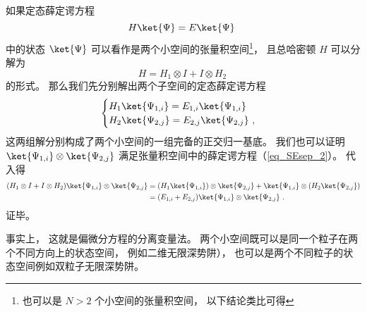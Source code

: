 
\begin{issues}
\issueDraft
\end{issues}


如果定态薛定谔方程
\begin{equation}\label{eq_SEsep_2}
H \ket{\Psi} = E \ket{\Psi}~
\end{equation}
中的状态 $\ket{\Psi}$ 可以看作是两个小空间的张量积空间\footnote{也可以是 $N > 2$ 个小空间的张量积空间， 以下结论类比可得}， 且总哈密顿 $H$ 可以分解为
\begin{equation}\label{eq_SEsep_1}
H = H_1 \otimes I + I \otimes H_2~
\end{equation}
的形式。 那么我们先分别解出两个子空间的定态薛定谔方程
\begin{equation}
\begin{cases}
H_1 \ket{\Psi_{1,i}} = E_{1,i} \ket{\Psi_{1,i}}\\
H_2 \ket{\Psi_{2,j}} = E_{2,j} \ket{\Psi_{2,j}}~,
\end{cases}
\end{equation}
这两组解分别构成了两个小空间的一组完备的正交归一基底。 我们也可以证明 $\ket{\Psi_{1,i}} \otimes \ket{\Psi_{2,j}}$ 满足张量积空间中的薛定谔方程（\autoref{eq_SEsep_2}）。 代入得
\begin{equation}
\begin{aligned}
(H_1 \otimes I + I \otimes H_2) \ket{\Psi_{1,i}} \otimes \ket{\Psi_{2,j}} &= (H_1 \ket{\Psi_{1,i}}) \otimes \ket{\Psi_{2,j}} +  \ket{\Psi_{1,i}} \otimes (H_2 \ket{\Psi_{2,j}})\\
&= (E_{1,i} + E_{2, j}) \ket{\Psi_{1,i}} \otimes \ket{\Psi_{2,j}}~.
\end{aligned}
\end{equation}
证毕。

事实上， 这就是偏微分方程的分离变量法。 两个小空间既可以是同一个粒子在两个不同方向上的状态空间， 例如二维无限深势阱）， 也可以是两个不同粒子的状态空间例如双粒子无限深势阱。%
